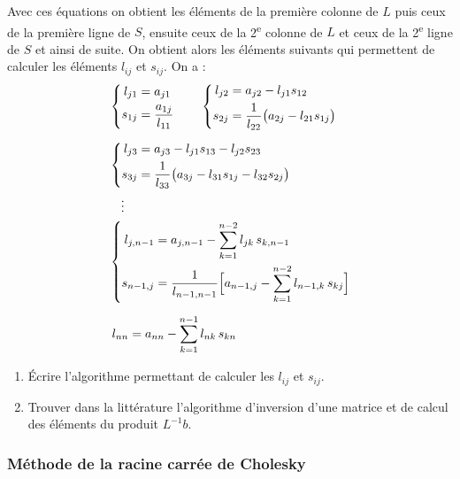 Avec ces équations on obtient les éléments de la première colonne de $L$ puis
ceux de la première ligne de $S$, ensuite ceux de la 2\textsuperscript{e}
colonne de $L$ et ceux de la 2\textsuperscript{e} ligne de $S$ et ainsi de
suite. On obtient alors les éléments suivants qui permettent de calculer les
éléments $l_{ij}$ et $s_{ij}$. On a :
\[
\begin{aligned}
  &\left\{\begin{aligned}
    l_{j1} &= a_{j1}\\
    s_{1j} &= \frac{a_{1j}}{l_{11}}
  \end{aligned}\right.
  \qquad
  \left\{\begin{aligned}
    l_{j2} &= a_{j2} - l_{j1}s_{12}\\
    s_{2j} &= \frac{1}{l_{22}}\bigl(a_{2j} - l_{21}s_{1j}\bigr)
  \end{aligned}\right.
  \\[0.6em]
  &\left\{\begin{aligned}
    l_{j3} &= a_{j3} - l_{j1}s_{13} - l_{j2}s_{23}\\
    s_{3j} &= \frac{1}{l_{33}}\bigl(a_{3j} - l_{31}s_{1j} - l_{32}s_{2j}\bigr)
  \end{aligned}\right.
  \\
  &\quad\vdots\\
  &\left\{\begin{aligned}
    l_{j,n-1} &= a_{j,n-1} - \sum_{k=1}^{n-2} l_{jk}\,s_{k,n-1}\\
    s_{n-1,j} &= \frac{1}{l_{n-1,n-1}}\Bigl[a_{n-1,j} - \sum_{k=1}^{n-2} l_{n-1,k}\,s_{kj}\Bigr]
  \end{aligned}\right.
  \\[0.6em]
  &\; l_{nn} = a_{nn} - \sum_{k=1}^{n-1} l_{nk}\,s_{kn}
\end{aligned}
\]

\begin{exercice}
\begin{enumerate}
  \item Écrire l'algorithme permettant de calculer les $l_{ij}$ et $s_{ij}$.
  \item Trouver dans la littérature l'algorithme d'inversion d'une matrice et
        de calcul des éléments du produit $L^{-1}b$.
\end{enumerate}
\end{exercice}

\subsubsection{Méthode de la racine carrée de Cholesky}

